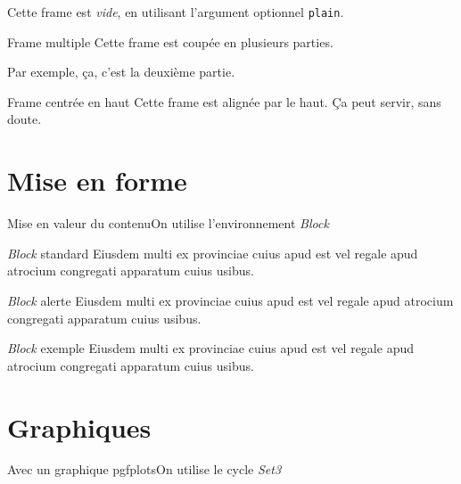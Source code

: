 \documentclass{eecslides}
\begin{document}
	\begin{frame}[plain]
		Cette frame est \emph{vide}, en utilisant l'argument optionnel \texttt{plain}.
	\end{frame}

	\begin{frame}[allowframebreaks]{Frame multiple}
		Cette frame est coupée en plusieurs parties.

		\framebreak

		Par exemple, ça, c'est la deuxième partie.
	\end{frame}

	\begin{frame}[t]{Frame centrée en haut}
	    Cette frame est alignée par le haut. Ça peut servir, sans doute.	
	\end{frame}

	\section{Mise en forme}

	\begin{frame}{Mise en valeur du contenu}{On utilise l'environnement \emph{Block}}
		\begin{center}
			\begin{block}{\emph{Block} standard}
				\small Eiusdem multi ex provinciae cuius apud est vel regale apud atrocium congregati apparatum cuius usibus.
			\end{block}
			\begin{alertblock}{\emph{Block} alerte}
				\small Eiusdem multi ex provinciae cuius apud est vel regale apud atrocium congregati apparatum cuius usibus.
			\end{alertblock}
			\begin{exampleblock}{\emph{Block} exemple}
				\small Eiusdem multi ex provinciae cuius apud est vel regale apud atrocium congregati apparatum cuius usibus.
			\end{exampleblock}
		\end{center}	
	\end{frame}	

	\section{Graphiques}

	\begin{frame}{Avec un graphique pgfplots}{On utilise le cycle \emph{Set3}}
		\begin{center}
			
		\end{center}	
	\end{frame}
\end{document}
